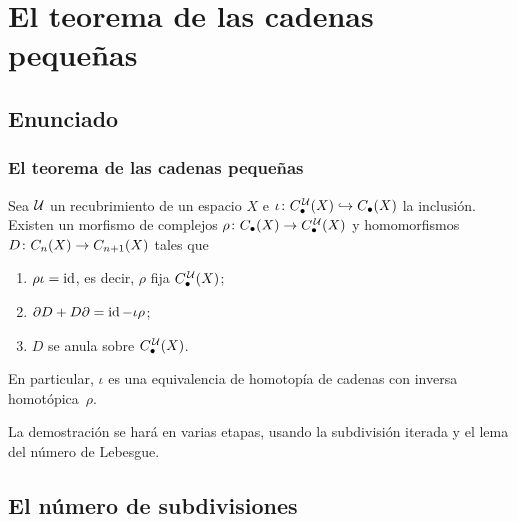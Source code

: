 \section{El teorema de las cadenas pequeñas}

\subsection{Enunciado}

\begin{frame}
  \frametitle{El teorema de las cadenas pequeñas}

  \begin{theorem}
    Sea $\mathcal{U}$ un recubrimiento de un espacio $X$ e
    $\iota\colon C^{\mkern2mu\mathcal{U}}_\bullet(X)\hookrightarrow C_\bullet(X)$ la inclusión.
    Existen un morfismo de complejos
    $\rho\colon C_\bullet(X)\to C^{\mkern2mu\mathcal{U}}_\bullet(X)$ y homomorfismos
    $D\colon C_n(X)\to C_{n+1}(X)$ tales que
    \begin{enumerate}
      \item $\rho\iota=\operatorname{id}$, es decir, $\rho$ fija $C^{\mkern2mu\mathcal{U}}_\bullet(X)$;
      \item $\partial D+D\partial=\operatorname{id}-\iota\rho$;
      \item $D$ se anula sobre $C^{\mkern2mu\mathcal{U}}_\bullet(X)$.
    \end{enumerate}
  \end{theorem}

  En particular, $\iota$ es una equivalencia de homotopía de cadenas con
  inversa homotópica~$\rho$.

  \medskip

  La demostración se hará en varias etapas, usando la subdivisión iterada y el lema del número de Lebesgue.
\end{frame}


\subsection{El número de subdivisiones}


